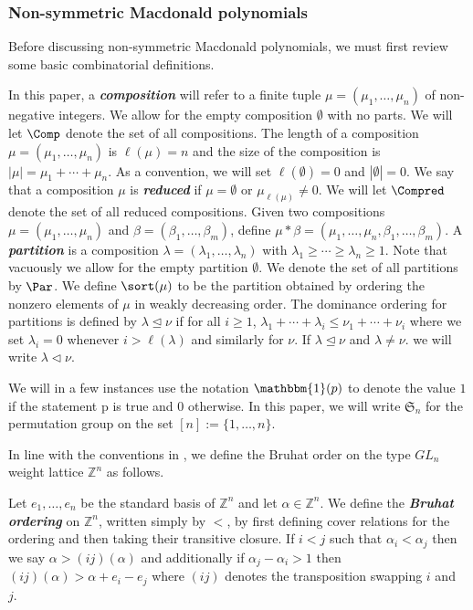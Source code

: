 \subsubsection{Non-symmetric Macdonald polynomials}
Before discussing non-symmetric Macdonald polynomials, we must first review some basic combinatorial definitions.

\begin{defi}
 In this paper, a \textbf{\textit{composition}} will refer to a finite tuple $\mu = (\mu_1,\ldots,\mu_n)$ of non-negative integers. We allow for the empty composition $\emptyset$ with no parts. We will let $\Comp$ denote the set of all compositions. The length of a composition $\mu = (\mu_1,\ldots,\mu_n)$ is $\ell(\mu) = n$ and the size of the composition is $| \mu | = \mu_1+\cdots+\mu_n$. As a convention, we will set $\ell(\emptyset) = 0$ and $|\emptyset| = 0.$ We say that a composition $\mu$ is \textbf{\textit{reduced}} if $\mu = \emptyset$ or $\mu_{\ell(\mu)} \neq 0.$ We will let $\Compred$ denote the set of all reduced compositions. Given two compositions $\mu = (\mu_1,\ldots,\mu_n)$ and $\beta = (\beta_1,\ldots,\beta_m)$, define $\mu * \beta = (\mu_1,\ldots,\mu_n,\beta_1,\ldots,\beta_m)$. A \textbf{\textit{partition}} is a composition $\lambda = (\lambda_1,\ldots,\lambda_n)$ with $\lambda_1\geq \cdots \geq \lambda_n \geq 1$. Note that vacuously we allow for the empty partition $\emptyset.$ We denote the set of all partitions by $\Par$. We define $\sort(\mu)$ to be the partition obtained by ordering the nonzero elements of $\mu$ in weakly decreasing order. The dominance ordering for partitions is defined by $\lambda \trianglelefteq \nu$ if for all $i\geq 1$, $\lambda_1 + \cdots +\lambda_i \leq \nu_1 + \cdots +\nu_i$ where we set $\lambda_i = 0$ whenever $i > \ell(\lambda)$ and similarly for $\nu$. If $\lambda \trianglelefteq \nu$ and $\lambda \neq \nu.$ we will write $\lambda \triangleleft \nu$.
 
 We will in a few instances use the notation $\mathbbm{1}(p)$ to denote the value $1$ if the statement p is true and $0$ otherwise. In this paper, we will write $\mathfrak{S}_n$ for the permutation group on the set $[n]:= \{1,\ldots,n\}.$
 \end{defi}

In line with the conventions in \cite{haglund2007combinatorial}, we define the Bruhat order on the type $GL_n$ weight lattice $\mathbb{Z}^{n}$ as follows. 

\begin{defi}
Let $e_1,\ldots,e_n$ be the standard basis of $\mathbb{Z}^n$ and let $\alpha \in \mathbb{Z}^n$. We define the\textbf{\textit{ Bruhat ordering}} on $\mathbb{Z}^n$, written simply by $<$, by first defining cover relations for the ordering and then taking their transitive closure. If $i<j$ such that $\alpha_i < \alpha_j$ then we say $\alpha > (ij)(\alpha)$ and additionally if $\alpha_j - \alpha_i > 1$ then $(ij)(\alpha) > \alpha + e_i - e_j$ where $(ij)$ denotes the transposition swapping $i$ and $j.$
\end{defi}

